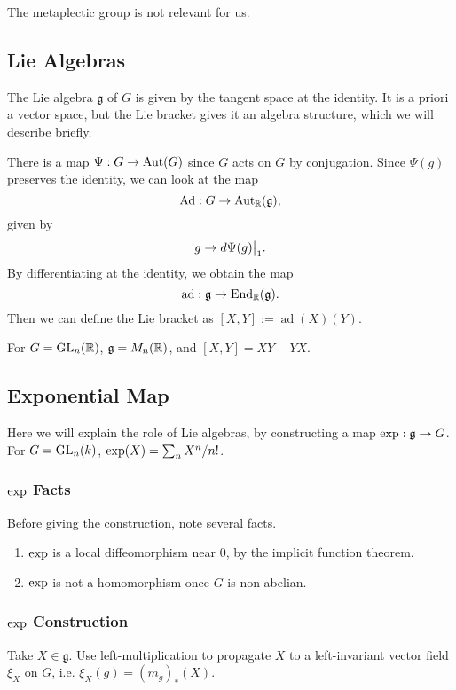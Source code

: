 The metaplectic group is not relevant for us.

\subsection{Lie Algebras}
The Lie algebra $\mathfrak{g}$ of $G$ is given by the tangent space at the 
identity. It is a priori a vector space, but the Lie bracket gives it an algebra
structure, which we will describe briefly.

There is a map $\Psi: G \rightarrow \operatorname{Aut}(G)$ since $G$ acts on $G$ by 
conjugation. Since $\Psi(g)$ preserves the identity, we can look at the map
\[ \operatorname{Ad}: G \rightarrow \operatorname{Aut}_{\mathbb{R}}(\mathfrak{g}), \]
given by \[ g \rightarrow \restr{d\Psi(g)}{1}.\] By differentiating at the 
identity, we obtain the map
\[ \operatorname{ad}: \mathfrak{g} \rightarrow \operatorname{End}_{\mathbb{R}}(\mathfrak{g}). \]
Then we can define the Lie bracket as $[X, Y] := \operatorname{ad}(X)(Y)$.

\begin{exmpl}
For $G = \mathrm{GL}_{n}({\mathbb{R}})$, $\mathfrak{g} = M_n(\mathbb{R})$, and $[X, Y] = XY - YX$.
\end{exmpl}

\subsection{Exponential Map}

Here we will explain the role of Lie algebras, by constructing a map
$\operatorname{exp} : \mathfrak{g} \rightarrow G$. For $G = \mathrm{GL}_{n}({k})$,
$\operatorname{exp}(X) = \sum_n X^n / n!$.

\subsubsection{$\operatorname{exp}$ Facts} Before giving the construction, note several
facts.

\begin{enumerate}[1.]
\item $\operatorname{exp}$ is a local diffeomorphism near 0, by the implicit function
theorem.
\item $\operatorname{exp}$ is not a homomorphism once $G$ is non-abelian.
\end{enumerate}

\subsubsection{$\operatorname{exp}$ Construction}
Take $X \in \mathfrak{g}$. Use left-multiplication to propagate $X$ to a
left-invariant vector field $\xi_X$ on $G$, i.e. $\xi_X(g) = (m_g)_*(X).$


